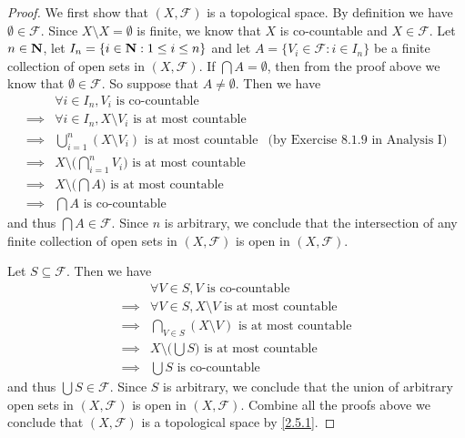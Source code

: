 \begin{proof}
  We first show that \((X, \mathcal{F})\) is a topological space.
  By definition we have \(\emptyset \in \mathcal{F}\).
  Since \(X \setminus X = \emptyset\) is finite, we know that \(X\) is co-countable and \(X \in \mathcal{F}\).
  Let \(n \in \mathbf{N}\), let \(I_n = \{i \in \mathbf{N} : 1 \leq i \leq n\}\) and let \(A = \{V_i \in \mathcal{F} : i \in I_n\}\) be a finite collection of open sets in \((X, \mathcal{F})\).
  If \(\bigcap A = \emptyset\), then from the proof above we know that \(\emptyset \in \mathcal{F}\).
  So suppose that \(A \neq \emptyset\).
  Then we have
  \begin{align*}
             & \forall i \in I_n, V_i \text{ is co-countable}                                                                        \\
    \implies & \forall i \in I_n, X \setminus V_i \text{ is at most countable}                                                       \\
    \implies & \bigcup_{i = 1}^n (X \setminus V_i) \text{ is at most countable}           & \text{(by Exercise 8.1.9 in Analysis I)} \\
    \implies & X \setminus \bigg(\bigcap_{i = 1}^n V_i\bigg) \text{ is at most countable}                                            \\
    \implies & X \setminus \bigg(\bigcap A\bigg) \text{ is at most countable}                                                        \\
    \implies & \bigcap A \text{ is co-countable}
  \end{align*}
  and thus \(\bigcap A \in \mathcal{F}\).
  Since \(n\) is arbitrary, we conclude that the intersection of any finite collection of open sets in \((X, \mathcal{F})\) is open in \((X, \mathcal{F})\).

  Let \(S \subseteq \mathcal{F}\).
  Then we have
  \begin{align*}
             & \forall V \in S, V \text{ is co-countable}                     \\
    \implies & \forall V \in S, X \setminus V \text{ is at most countable}    \\
    \implies & \bigcap_{V \in S} (X \setminus V) \text{ is at most countable} \\
    \implies & X \setminus \bigg(\bigcup S\bigg) \text{ is at most countable} \\
    \implies & \bigcup S \text{ is co-countable}
  \end{align*}
  and thus \(\bigcup S \in \mathcal{F}\).
  Since \(S\) is arbitrary, we conclude that the union of arbitrary open sets in \((X, \mathcal{F})\) is open in \((X, \mathcal{F})\).
  Combine all the proofs above we conclude that \((X, \mathcal{F})\) is a topological space by \cref{2.5.1}.


\end{proof}
